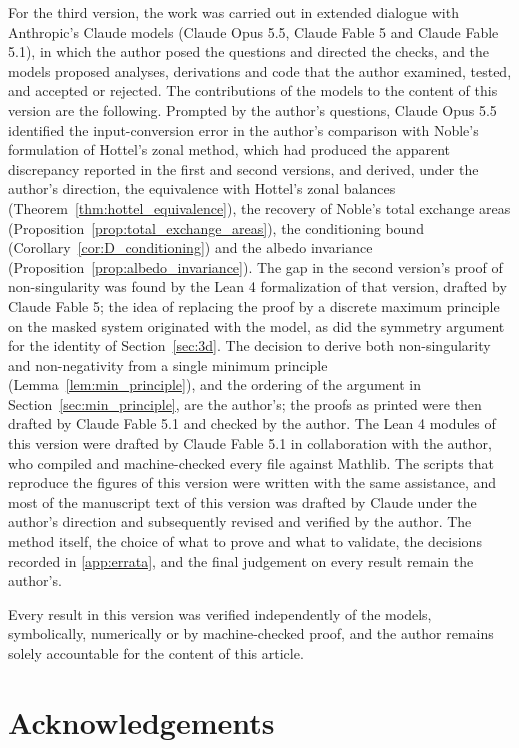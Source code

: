 \documentclass[preprint,1p,times]{elsarticle}
\theoremstyle{plain}
\theoremstyle{definition}
\theoremstyle{remark}
\begin{document}
For the third version, the work was carried out in extended dialogue with Anthropic's Claude models (Claude Opus 5.5, Claude Fable 5 and Claude Fable 5.1), in which the author posed the questions and directed the checks, and the models proposed analyses, derivations and code that the author examined, tested, and accepted or rejected. The contributions of the models to the content of this version are the following. Prompted by the author's questions, Claude Opus 5.5 identified the input-conversion error in the author's comparison with Noble's formulation of Hottel's zonal method, which had produced the apparent discrepancy reported in the first and second versions, and derived, under the author's direction, the equivalence with Hottel's zonal balances (Theorem~\ref{thm:hottel_equivalence}), the recovery of Noble's total exchange areas (Proposition~\ref{prop:total_exchange_areas}), the conditioning bound (Corollary~\ref{cor:D_conditioning}) and the albedo invariance (Proposition~\ref{prop:albedo_invariance}). The gap in the second version's proof of non-singularity was found by the Lean 4 formalization of that version, drafted by Claude Fable 5; the idea of replacing the proof by a discrete maximum principle on the masked system originated with the model, as did the symmetry argument for the identity of Section~\ref{sec:3d}. The decision to derive both non-singularity and non-negativity from a single minimum principle (Lemma~\ref{lem:min_principle}), and the ordering of the argument in Section~\ref{sec:min_principle}, are the author's; the proofs as printed were then drafted by Claude Fable 5.1 and checked by the author. The Lean 4 modules of this version were drafted by Claude Fable 5.1 in collaboration with the author, who compiled and machine-checked every file against Mathlib. The scripts that reproduce the figures of this version were written with the same assistance, and most of the manuscript text of this version was drafted by Claude under the author's direction and subsequently revised and verified by the author. The method itself, the choice of what to prove and what to validate, the decisions recorded in \ref{app:errata}, and the final judgement on every result remain the author's.

Every result in this version was verified independently of the models, symbolically, numerically or by machine-checked proof, and the author remains solely accountable for the content of this article.

\section*{Acknowledgements}
\end{document}
